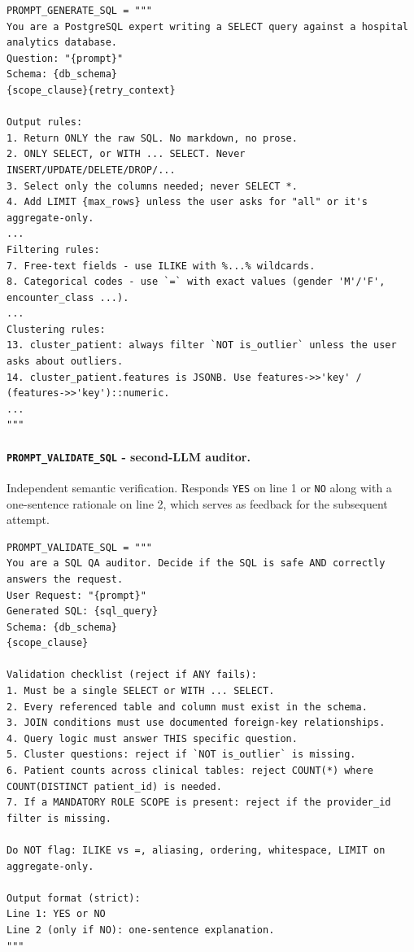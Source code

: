 \begin{lstlisting}[style=pythonstyle]
PROMPT_GENERATE_SQL = """
You are a PostgreSQL expert writing a SELECT query against a hospital analytics database.
Question: "{prompt}"
Schema: {db_schema}
{scope_clause}{retry_context}

Output rules:
1. Return ONLY the raw SQL. No markdown, no prose.
2. ONLY SELECT, or WITH ... SELECT. Never INSERT/UPDATE/DELETE/DROP/...
3. Select only the columns needed; never SELECT *.
4. Add LIMIT {max_rows} unless the user asks for "all" or it's aggregate-only.
...
Filtering rules:
7. Free-text fields - use ILIKE with %...% wildcards.
8. Categorical codes - use `=` with exact values (gender 'M'/'F', encounter_class ...).
...
Clustering rules:
13. cluster_patient: always filter `NOT is_outlier` unless the user asks about outliers.
14. cluster_patient.features is JSONB. Use features->>'key' / (features->>'key')::numeric.
...
"""
\end{lstlisting}

\paragraph{\texttt{PROMPT\_\allowbreak VALIDATE\_\allowbreak SQL} - second-LLM auditor.} Independent semantic verification. Responds \texttt{YES} on line 1 or \texttt{NO} along with a one-sentence rationale on line 2, which serves as feedback for the subsequent attempt.

\begin{lstlisting}[style=pythonstyle]
PROMPT_VALIDATE_SQL = """
You are a SQL QA auditor. Decide if the SQL is safe AND correctly answers the request.
User Request: "{prompt}"
Generated SQL: {sql_query}
Schema: {db_schema}
{scope_clause}

Validation checklist (reject if ANY fails):
1. Must be a single SELECT or WITH ... SELECT.
2. Every referenced table and column must exist in the schema.
3. JOIN conditions must use documented foreign-key relationships.
4. Query logic must answer THIS specific question.
5. Cluster questions: reject if `NOT is_outlier` is missing.
6. Patient counts across clinical tables: reject COUNT(*) where COUNT(DISTINCT patient_id) is needed.
7. If a MANDATORY ROLE SCOPE is present: reject if the provider_id filter is missing.

Do NOT flag: ILIKE vs =, aliasing, ordering, whitespace, LIMIT on aggregate-only.

Output format (strict):
Line 1: YES or NO
Line 2 (only if NO): one-sentence explanation.
"""
\end{lstlisting}

